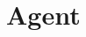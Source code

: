 \section{Agent}

\subsection{}
\begin{pc}
\end{pc}

\subsection{}
\begin{pc}
\end{pc}

\subsection{}
\begin{pc}
\end{pc}

\subsection{}
\begin{pc}
\end{pc}
